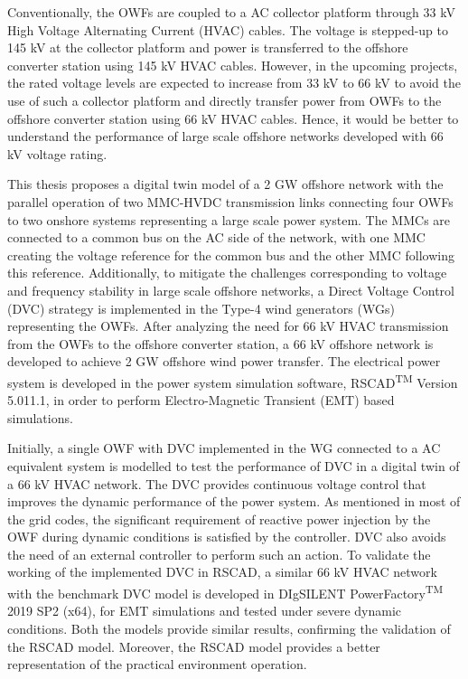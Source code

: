 Conventionally, the OWFs are coupled to a AC collector platform through 33 kV High Voltage Alternating Current (HVAC) cables. The voltage is stepped-up to 145 kV at the collector platform and power is transferred to the offshore converter station using 145 kV HVAC cables. However, in the upcoming projects, the rated voltage levels are expected to increase from 33 kV to 66 kV to avoid the use of such a collector platform and directly transfer power from OWFs to the offshore converter station using 66 kV HVAC cables. Hence, it would be better to understand the performance of large scale offshore networks developed with 66 kV voltage rating.   

This thesis proposes a digital twin model of a 2 GW offshore network with the parallel operation of two MMC-HVDC transmission links connecting four OWFs to two onshore systems representing a large scale power system. The MMCs are connected to a common bus on the AC side of the network, with one MMC creating the voltage reference for the common bus and the other MMC following this reference. Additionally, to mitigate the challenges corresponding to voltage and frequency stability in large scale offshore networks, a Direct Voltage Control (DVC) strategy is implemented in the Type-4 wind generators (WGs) representing the OWFs. After analyzing the need for 66 kV HVAC transmission from the OWFs to the offshore converter station, a 66 kV offshore network is developed to achieve 2 GW offshore wind power transfer. The electrical power system is developed in the power system simulation software, RSCAD\textsuperscript{TM} Version 5.011.1, in order to perform Electro-Magnetic Transient (EMT) based simulations. 

Initially, a single OWF with DVC implemented in the WG connected to a AC equivalent system is modelled to test the performance of DVC in a digital twin of a 66 kV HVAC network. The DVC provides continuous voltage control that improves the dynamic performance of the power system. As mentioned in most of the grid codes, the significant requirement of reactive power injection by the OWF during dynamic conditions is satisfied by the controller. DVC also avoids the need of an external controller to perform such an action. To validate the working of the implemented DVC in RSCAD, a similar 66 kV HVAC network with the benchmark DVC model is developed in DIgSILENT PowerFactory\textsuperscript{TM} 2019 SP2 (x64), for EMT simulations and tested under severe dynamic conditions. Both the models provide similar results, confirming the validation of the RSCAD model. Moreover, the RSCAD model provides a better representation of the practical environment operation. 

